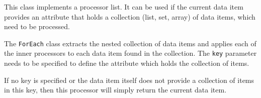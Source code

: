 
This class implements a processor list. It can be used if the current
data item provides an attribute that holds a collection (list, set,
array) of data items, which need to be processed.

The \texttt{ForEach} class extracts the nested collection of data items
and applies each of the inner processors to each data item found in the
collection. The \texttt{key} parameter needs to be specified to define
the attribute which holds the collection of items.

If no key is specified or the data item itself does not provide a
collection of items in this key, then this processor will simply return
the current data item.

\begin{table}[h]
\end{table}
